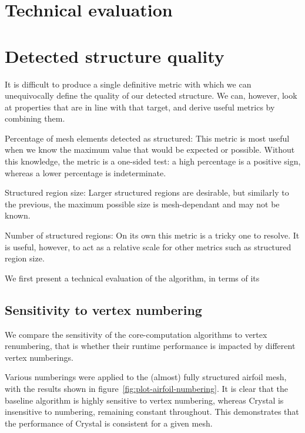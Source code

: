 \section{Technical evaluation}
\section{Detected structure quality}
It is difficult to produce a single definitive metric with which we can unequivocally define the quality of our detected structure. We can, however, look at properties that are in line with that target, and derive useful metrics by combining them.

Percentage of mesh elements detected as structured:
This metric is most useful when we know the maximum value that would be expected or possible.
Without this knowledge, the metric is a one-sided test: a high percentage is a positive sign, whereas a lower percentage is indeterminate.

Structured region size:
Larger structured regions are desirable, but similarly to the previous, the maximum possible size is mesh-dependant and may not be known.

Number of structured regions:
On its own this metric is a tricky one to resolve. It is useful, however, to act as a relative scale for other metrics such as structured region size.





We first present a technical evaluation of the algorithm, in terms of its


\subsection{Sensitivity to vertex numbering}
We compare the sensitivity of the core-computation algorithms to vertex renumbering, that is whether their runtime performance is impacted by different vertex numberings.

Various numberings were applied to the (almost) fully structured airfoil mesh, with the results shown in figure~\ref{fig:plot-airfoil-numbering}. It is clear that the baseline algorithm is highly sensitive to vertex numbering, whereas Crystal is insensitive to numbering, remaining constant throughout. This demonstrates that the performance of Crystal is consistent for a given mesh.

